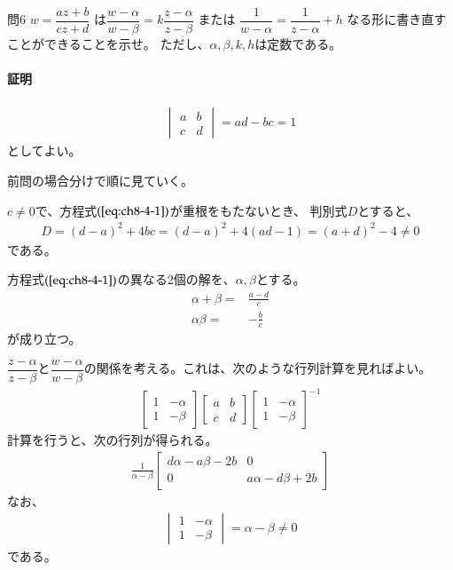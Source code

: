 \newpage
\begin{mysimplebox}{問6}
    $w=\dfrac{az+b}{cz+d}$
    は$\dfrac{w-\alpha}{w-\beta}=k\dfrac{z-\alpha}{z-\beta}$
    または
    $\dfrac{1}{w-\alpha}=\dfrac{1}{z-\alpha}+h$
    なる形に書き直すことができることを示せ。
    ただし、$\alpha,\beta,k,h$は定数である。
\end{mysimplebox}
\paragraph{証明}
\begin{align*}
    \begin{vmatrix}
        a&b\\
        c&d
    \end{vmatrix}
    =ad-bc=1
\end{align*}
としてよい。

前問の場合分けで順に見ていく。

$c\neq0$で、方程式$(\ref{eq:ch8-4-1})$が重根をもたないとき、
判別式$D$とすると、
\begin{align*}
    D=(d-a)^2+4bc
    =(d-a)^2+4(ad-1)
    =(a+d)^2-4\neq0
\end{align*}
である。

方程式$(\ref{eq:ch8-4-1})$の異なる2個の解を、$\alpha,\beta$とする。
\begin{align*}
    \alpha+\beta=&\frac{a-d}{c}\\
    \alpha\beta=&-\frac{b}{c}
\end{align*}
が成り立つ。

$\dfrac{z-\alpha}{z-\beta}$と$\dfrac{w-\alpha}{w-\beta}$の関係を考える。これは、次のような行列計算を見ればよい。
\begin{align*}
    \begin{bmatrix}
        1&-\alpha\\
        1&-\beta
    \end{bmatrix}
    \begin{bmatrix}
        a&b\\
        c&d
    \end{bmatrix}
    \begin{bmatrix}
        1&-\alpha\\
        1&-\beta
    \end{bmatrix}^{-1}
\end{align*}
計算を行うと、次の行列が得られる。
\begin{align*}
    \frac{1}{\alpha-\beta}
    \begin{bmatrix}
        d\alpha-a\beta-2b&0\\
        0&a\alpha-d\beta+2b
    \end{bmatrix}
\end{align*}
なお、
\begin{align*}
    \begin{vmatrix}
        1&-\alpha\\
        1&-\beta
    \end{vmatrix}
    =\alpha-\beta\neq0
\end{align*}
である。

